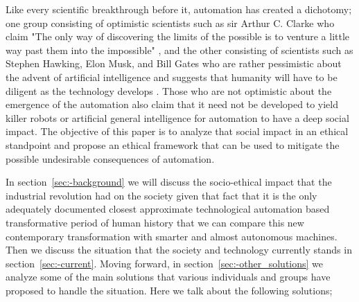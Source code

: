 Like every scientific breakthrough before it, automation has created a dichotomy; one group consisting of optimistic scientists such as sir Arthur C. Clarke who claim "The only way of discovering the limits of the possible is to venture a little way past them into the impossible" \cite{arthur1962limits}, and the other consisting of scientists such as Stephen Hawking, Elon Musk, and Bill Gates who are rather pessimistic about the advent of artificial intelligence and suggests that humanity will have to be diligent as the technology develops \cite{michael2016warning}. Those who are not optimistic about the emergence of the automation also claim that it need not be developed to yield killer robots or artificial general intelligence \cite{luke2013agi} for automation to have a deep social impact. The objective of this paper is to analyze that social impact in an ethical standpoint and propose an ethical framework that can be used to mitigate the possible undesirable consequences of automation. 

In section~\ref{sec:-background} we will discuss the socio-ethical impact that the industrial revolution had on the society given that fact that it is the only adequately documented closest approximate technological automation based transformative period of human history that we can compare this new contemporary transformation with smarter and almost autonomous machines. Then we discuss the situation that the society and technology currently stands in section~\ref{sec:-current}. Moving forward, in section~\ref{sec:-other_solutions}  we analyze some of the main solutions that various individuals and groups have proposed to handle the situation. Here we talk about the following solutions;  

